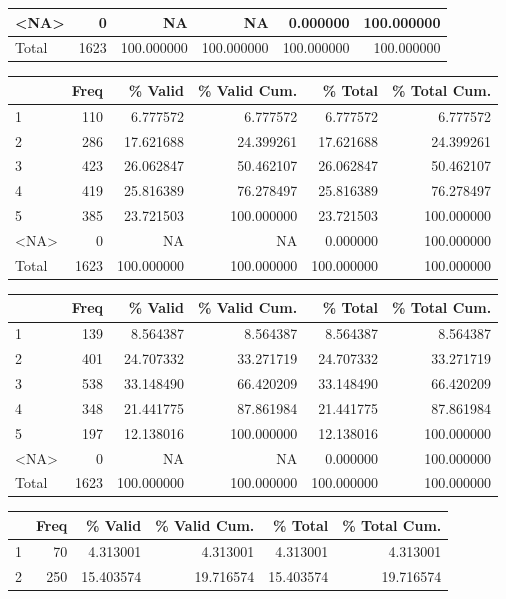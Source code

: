 \documentclass[
  letterpaper,
  DIV=11,
  numbers=noendperiod]{scrartcl}
\begin{document}
\begin{table}
\begin{tabular}[t]{l|r|r|r|r|r}
\hline
<NA> & 0 & NA & NA & 0.000000 & 100.000000\\
\hline
Total & 1623 & 100.000000 & 100.000000 & 100.000000 & 100.000000\\
\hline
\end{tabular}
\centering
\begin{tabular}[t]{l|r|r|r|r|r}
\hline
  & Freq & \% Valid & \% Valid Cum. & \% Total & \% Total Cum.\\
\hline
1 & 110 & 6.777572 & 6.777572 & 6.777572 & 6.777572\\
\hline
2 & 286 & 17.621688 & 24.399261 & 17.621688 & 24.399261\\
\hline
3 & 423 & 26.062847 & 50.462107 & 26.062847 & 50.462107\\
\hline
4 & 419 & 25.816389 & 76.278497 & 25.816389 & 76.278497\\
\hline
5 & 385 & 23.721503 & 100.000000 & 23.721503 & 100.000000\\
\hline
<NA> & 0 & NA & NA & 0.000000 & 100.000000\\
\hline
Total & 1623 & 100.000000 & 100.000000 & 100.000000 & 100.000000\\
\hline
\end{tabular}
\centering
\begin{tabular}[t]{l|r|r|r|r|r}
\hline
  & Freq & \% Valid & \% Valid Cum. & \% Total & \% Total Cum.\\
\hline
1 & 139 & 8.564387 & 8.564387 & 8.564387 & 8.564387\\
\hline
2 & 401 & 24.707332 & 33.271719 & 24.707332 & 33.271719\\
\hline
3 & 538 & 33.148490 & 66.420209 & 33.148490 & 66.420209\\
\hline
4 & 348 & 21.441775 & 87.861984 & 21.441775 & 87.861984\\
\hline
5 & 197 & 12.138016 & 100.000000 & 12.138016 & 100.000000\\
\hline
<NA> & 0 & NA & NA & 0.000000 & 100.000000\\
\hline
Total & 1623 & 100.000000 & 100.000000 & 100.000000 & 100.000000\\
\hline
\end{tabular}
\centering
\begin{tabular}[t]{l|r|r|r|r|r}
\hline
  & Freq & \% Valid & \% Valid Cum. & \% Total & \% Total Cum.\\
\hline
1 & 70 & 4.313001 & 4.313001 & 4.313001 & 4.313001\\
\hline
2 & 250 & 15.403574 & 19.716574 & 15.403574 & 19.716574\\

\end{tabular}
\end{table}
\end{document}
